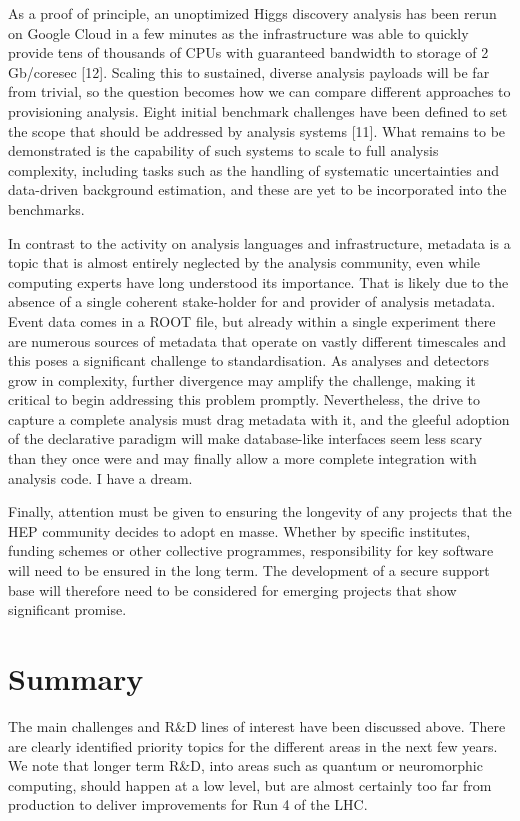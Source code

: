 \documentclass[10pt,a4paper]{article}
\begin{document}
As a proof of principle, an unoptimized Higgs discovery analysis has
been rerun on Google Cloud in a few minutes as the infrastructure was
able to quickly provide tens of thousands of CPUs with guaranteed
bandwidth to storage of 2 Gb/coresec {[}12{]}. Scaling this to
sustained, diverse analysis payloads will be far from trivial, so the
question becomes how we can compare different approaches to provisioning
analysis. Eight initial benchmark challenges have been defined to set
the scope that should be addressed by analysis systems {[}11{]}. What
remains to be demonstrated is the capability of such systems to scale to
full analysis complexity, including tasks such as the handling of
systematic uncertainties and data-driven background estimation, and
these are yet to be incorporated into the benchmarks.

In contrast to the activity on analysis languages and infrastructure,
metadata is a topic that is almost entirely neglected by the analysis
community, even while computing experts have long understood its
importance. That is likely due to the absence of a single coherent
stake-holder for and provider of analysis metadata. Event data comes in
a ROOT file, but already within a single experiment there are numerous
sources of metadata that operate on vastly different timescales and this
poses a significant challenge to standardisation. As analyses and
detectors grow in complexity, further divergence may amplify the
challenge, making it critical to begin addressing this problem promptly.
Nevertheless, the drive to capture a complete analysis must drag
metadata with it, and the gleeful adoption of the declarative paradigm
will make database-like interfaces seem less scary than they once were
and may finally allow a more complete integration with analysis code. I
have a dream.

Finally, attention must be given to ensuring the longevity of any
projects that the HEP community decides to adopt en masse. Whether by
specific institutes, funding schemes or other collective programmes,
responsibility for key software will need to be ensured in the long
term. The development of a secure support base will therefore need to be
considered for emerging projects that show significant promise.

\hypertarget{summary}{%
\section{Summary}\label{summary}}

The main challenges and R\&D lines of interest have been discussed
above. There are clearly identified priority topics for the different
areas in the next few years. We note that longer term R\&D, into areas
such as quantum or neuromorphic computing, should happen at a low level,
but are almost certainly too far from production to deliver improvements
for Run 4 of the LHC.
\end{document}
